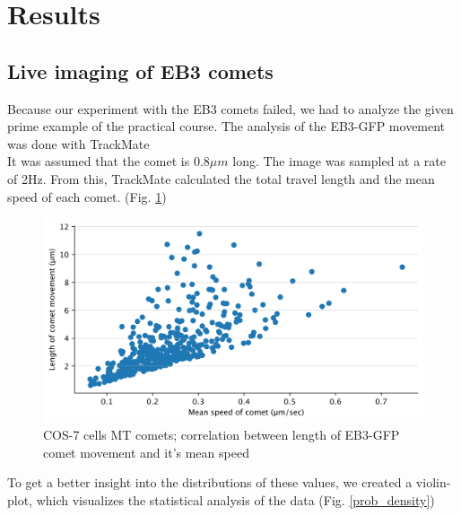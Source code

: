 \section{Results}
\subsection{Live imaging of EB3 comets}
Because our experiment with the EB3 comets failed, we had to analyze the given prime example of the practical course.  
The analysis of the EB3-GFP movement was done with TrackMate \cite{Ershov_2021} \cite{Tinevez_2017} \\
It was assumed that the comet is $0.8\mu m$ long. The image was sampled at a rate of 2Hz. From this, TrackMate calculated the total travel length and the mean speed of each comet. (Fig. \ref{mt_live})

\begin{figure}[h!]
	\begin{center}
		\begin{minipage}{0,8\textwidth}
			
			\includegraphics[width=\textwidth]{analysis/reports/distance_vs_meanspeed.png}
			\caption{COS-7 cells MT comets; correlation between length of EB3-GFP comet movement and it's mean speed} 
			\label{mt_live} 
		\end{minipage}
	\end{center}
\end{figure}

To get a better insight into the distributions of these values, we created a violin-plot, which visualizes the statistical analysis of the data (Fig. \ref{prob_density})

